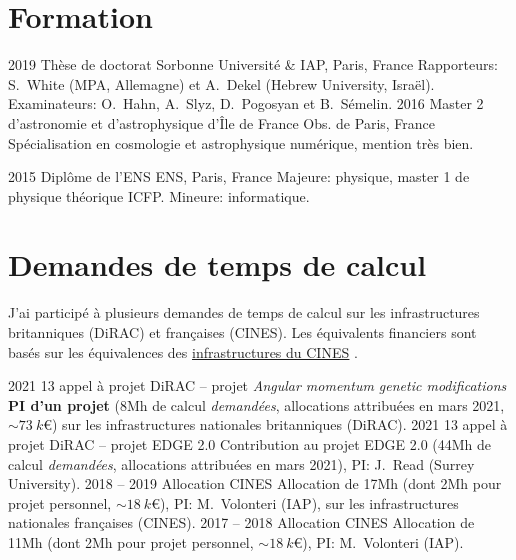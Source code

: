 \documentclass[french]{cv-style}
\newcommand{\myhref}[2]{\href{#1}{%
  \setul{1pt}{.4pt}%
  \setulcolor{red}%
  \ul{#2}}%
}
\renewcommand{\hl}[1]{\textbf{\color{darkred}#1}}
\begin{document}
%
%
%

\section{Formation}

\begin{entrylist}
%
\entry
{2019}
{Thèse de doctorat}
{Sorbonne Université \& IAP, Paris, France}
{Rapporteurs: S.~White (MPA, Allemagne) et A.~Dekel (Hebrew University, Israël). Examinateurs: O.~Hahn, A.~Slyz, D.~Pogosyan et B.~Sémelin.}
%
\entry
{2016}
{Master 2 d'astronomie et d'astrophysique d'Île de France}
{Obs. de Paris, France}
{Spécialisation en cosmologie et astrophysique numérique, mention très bien.}

%
\entry
{2015}
{Diplôme de l'ENS}
{ENS, Paris, France}
{Majeure: physique, master 1 de physique théorique ICFP. Mineure: informatique.}
%
%
%
%
%
%
%
%
%
%
%
%
%
%
%
%
%
%
%
%
%
%
%
%
%

\end{entrylist}

%
%
%
\section{Demandes de temps de calcul}
J'ai participé à plusieurs demandes de temps de calcul sur les infrastructures britanniques (DiRAC) et françaises (CINES). Les équivalents financiers sont basés sur les équivalences des \myhref{https://www.genci.fr/sites/default/files/Modalitesdacces.pdf}{infrastructures du CINES}.
\begin{entrylist}
%
\entry
{2021}
{13\ieme{} appel à projet DiRAC -- projet \emph{Angular momentum genetic modifications}}
{}
{\hl{PI d'un projet} (8Mh de calcul \emph{demandées}, allocations attribuées en mars 2021, $\sim \SI{73}{k€}$) sur les infrastructures nationales britanniques (DiRAC).}
%
\entry
{2021}
{13\ieme{} appel à projet DiRAC -- projet EDGE 2.0}
{}
{Contribution au projet EDGE 2.0 (44Mh de calcul \emph{demandées}, allocations attribuées en mars 2021), PI: J.~Read (Surrey University).}
%
\entry
{2018 -- 2019}
{Allocation CINES}
{}
{Allocation de 17Mh (dont 2Mh pour projet personnel, $\sim \SI{18}{k€}$), PI: M.~Volonteri (IAP), sur les infrastructures nationales françaises (CINES).}
%
\entry
{2017 -- 2018}
{Allocation CINES}
{}
{Allocation de 11Mh (dont 2Mh pour projet personnel, $\sim \SI{18}{k€}$), PI: M.~Volonteri (IAP).}
\end{entrylist}
\end{document}
